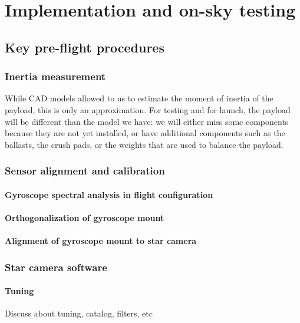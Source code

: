 
\chapter[Implementation and on-sky testing]{Implementation and on-sky testing} %



\section{Key pre-flight procedures}
\subsection{Inertia measurement}
While CAD models allowed to us to estimate the moment of inertia of the payload, this is only an approximation. For testing and for launch, the payload will be different than the model we have: we will either miss some components because they are not yet installed, or have additional components such as the ballasts, the crush pads, or the weights that are used to balance the payload.
\subsection{Sensor alignment and calibration}
\subsubsection{Gyroscope spectral analysis in flight configuration}
\subsubsection{Orthogonalization of gyroscope mount}

\subsubsection{Alignment of gyroscope mount to star camera}

\subsection{Star camera software}
\subsubsection{Tuning}
Discuss about tuning, catalog, filters, etc
